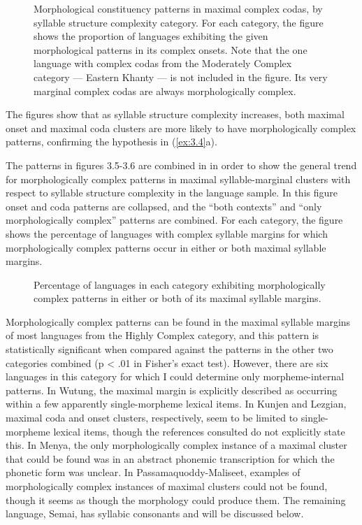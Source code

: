 \begin{figure}
\caption{\label{fig:3.6} Morphological constituency patterns in maximal complex codas, by syllable structure complexity category. For each category, the figure shows the proportion of languages exhibiting the given morphological patterns in its complex onsets. Note that the one language with complex codas from the Moderately Complex category — Eastern Khanty — is not included in the figure. Its very marginal complex codas are always morphologically complex.}
\end{figure}


  The figures show that as syllable structure complexity increases, both maximal onset and maximal coda clusters are more likely to have morphologically complex patterns, confirming the hypothesis in (\ref{ex:3.4}a).

  The patterns in figures 3.5-3.6 are combined in  in order to show the general trend for morphologically complex patterns in maximal syllable-marginal clusters with respect to syllable structure complexity in the language sample. In this figure onset and coda patterns are collapsed, and the “both contexts” and “only morphologically complex” patterns are combined. For each category, the figure shows the percentage of languages with complex syllable margins for which morphologically complex patterns occur in either or both maximal syllable margins.


\begin{figure}  
\caption{\label{fig:3.7} Percentage of languages in each category exhibiting morphologically complex patterns in either or both of its maximal syllable margins.}
\end{figure}

  Morphologically complex patterns can be found in the maximal syllable margins of most languages from the Highly Complex category, and this pattern is statistically significant when compared against the patterns in the other two categories combined (p < .01 in Fisher’s exact test). However, there are six languages in this category for which I could determine only morpheme-internal patterns. In Wutung, the maximal margin is explicitly described as occurring within a few apparently single-morpheme lexical items. In Kunjen and Lezgian, maximal coda and onset clusters, respectively, seem to be limited to single-morpheme lexical items, though the references consulted do not explicitly state this. In Menya, the only morphologically complex instance of a maximal cluster that could be found was in an abstract phonemic transcription for which the phonetic form was unclear. In Passamaquoddy-Maliseet, examples of morphologically complex instances of maximal clusters could not be found, though it seems as though the morphology could produce them. The remaining language, Semai, has syllabic consonants and will be discussed below.

